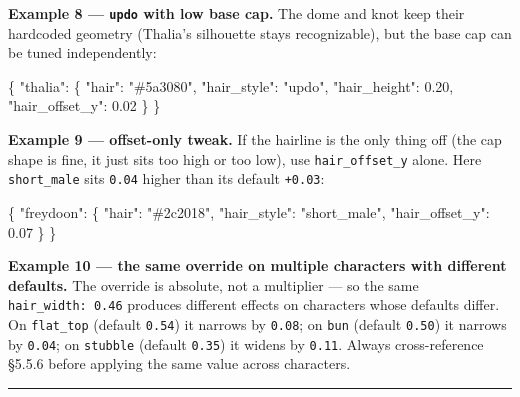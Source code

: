 \documentclass[
  11pt,
]{book}
\newenvironment{Shaded}{}{}
\newcommand{\DataTypeTok}[1]{\textcolor[rgb]{0.56,0.13,0.00}{#1}}
\newcommand{\FloatTok}[1]{\textcolor[rgb]{0.25,0.63,0.44}{#1}}
\newcommand{\FunctionTok}[1]{\textcolor[rgb]{0.02,0.16,0.49}{#1}}
\newcommand{\StringTok}[1]{\textcolor[rgb]{0.25,0.44,0.63}{#1}}
\begin{document}
\textbf{Example 8 --- \texttt{updo} with low base cap.} The dome and
knot keep their hardcoded geometry (Thalia's silhouette stays
recognizable), but the base cap can be tuned independently:

\begin{Shaded}
\begin{Highlighting}[]
\FunctionTok{\{}
  \DataTypeTok{"thalia"}\FunctionTok{:} \FunctionTok{\{}
    \DataTypeTok{"hair"}\FunctionTok{:}           \StringTok{"\#5a3080"}\FunctionTok{,}
    \DataTypeTok{"hair\_style"}\FunctionTok{:}     \StringTok{"updo"}\FunctionTok{,}
    \DataTypeTok{"hair\_height"}\FunctionTok{:}    \FloatTok{0.20}\FunctionTok{,}
    \DataTypeTok{"hair\_offset\_y"}\FunctionTok{:}  \FloatTok{0.02}
  \FunctionTok{\}}
\FunctionTok{\}}
\end{Highlighting}
\end{Shaded}

\textbf{Example 9 --- offset-only tweak.} If the hairline is the only
thing off (the cap shape is fine, it just sits too high or too low), use
\texttt{hair\_offset\_y} alone. Here \texttt{short\_male} sits
\texttt{0.04} higher than its default \texttt{+0.03}:

\begin{Shaded}
\begin{Highlighting}[]
\FunctionTok{\{}
  \DataTypeTok{"freydoon"}\FunctionTok{:} \FunctionTok{\{}
    \DataTypeTok{"hair"}\FunctionTok{:}          \StringTok{"\#2c2018"}\FunctionTok{,}
    \DataTypeTok{"hair\_style"}\FunctionTok{:}    \StringTok{"short\_male"}\FunctionTok{,}
    \DataTypeTok{"hair\_offset\_y"}\FunctionTok{:} \FloatTok{0.07}
  \FunctionTok{\}}
\FunctionTok{\}}
\end{Highlighting}
\end{Shaded}

\textbf{Example 10 --- the same override on multiple characters with
different defaults.} The override is absolute, not a multiplier --- so
the same \texttt{hair\_width:\ 0.46} produces different effects on
characters whose defaults differ. On \texttt{flat\_top} (default
\texttt{0.54}) it narrows by \texttt{0.08}; on \texttt{bun} (default
\texttt{0.50}) it narrows by \texttt{0.04}; on \texttt{stubble} (default
\texttt{0.35}) it widens by \texttt{0.11}. Always cross-reference
§5.5.6 before applying the same value across characters.

\begin{center}\rule{0.5\linewidth}{0.5pt}\end{center}
\end{document}
